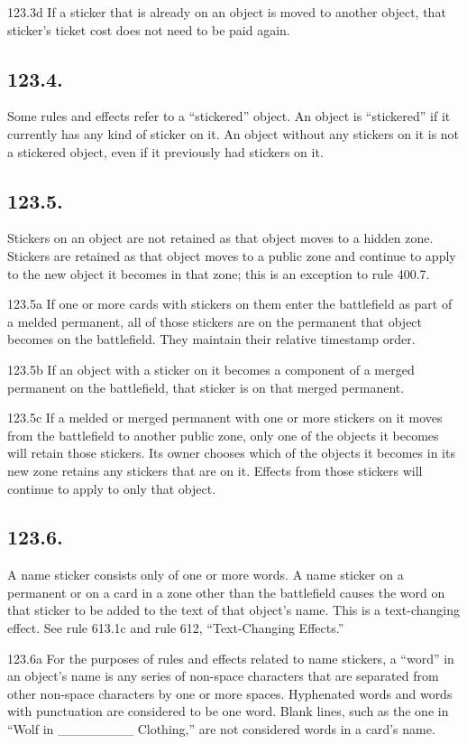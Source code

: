 123.3d If a sticker that is already on an object is moved to another object, that sticker’s ticket cost does not need to be paid again.

\subsection*{123.4.}
Some rules and effects refer to a “stickered” object. An object is “stickered” if it currently has any kind of sticker on it. An object without any stickers on it is not a stickered object, even if it previously had stickers on it.

\subsection*{123.5.}
Stickers on an object are not retained as that object moves to a hidden zone. Stickers are retained as that object moves to a public zone and continue to apply to the new object it becomes in that zone; this is an exception to rule 400.7.

123.5a If one or more cards with stickers on them enter the battlefield as part of a melded permanent, all of those stickers are on the permanent that object becomes on the battlefield. They maintain their relative timestamp order.

123.5b If an object with a sticker on it becomes a component of a merged permanent on the battlefield, that sticker is on that merged permanent.

123.5c If a melded or merged permanent with one or more stickers on it moves from the battlefield to another public zone, only one of the objects it becomes will retain those stickers. Its owner chooses which of the objects it becomes in its new zone retains any stickers that are on it. Effects from those stickers will continue to apply to only that object.

\subsection*{123.6.}
A name sticker consists only of one or more words. A name sticker on a permanent or on a card in a zone other than the battlefield causes the word on that sticker to be added to the text of that object’s name. This is a text-changing effect. See rule 613.1c and rule 612, “Text-Changing Effects.”

123.6a For the purposes of rules and effects related to name stickers, a “word” in an object’s name is any series of non-space characters that are separated from other non-space characters by one or more spaces. Hyphenated words and words with punctuation are considered to be one word. Blank lines, such as the one in “Wolf in \_\_\_\_\_\_\_\_ Clothing,” are not considered words in a card’s name.

